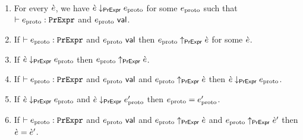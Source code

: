 \begin{condition}\label{condition:proto-expression-isomorphism} ~
\begin{enumerate}
\item For every $\grave{e}$, we have $\grave{e} \downarrow_\mathsf{PrExpr} e_\text{proto}$ for some $e_\text{proto}$ such that $\vdash e_\text{proto} : \mathtt{PrExpr}$ and $e_\text{proto}~\mathsf{val}$.
\item If $\vdash e_\text{proto} : \mathtt{PrExpr}$ and $e_\text{proto}~\mathsf{val}$ then $e_\text{proto} \uparrow_\mathsf{PrExpr} \grave{e}$ for some $\grave{e}$.
\item If $\grave{e} \downarrow_\mathsf{PrExpr} e_\text{proto}$ then $e_\text{proto} \uparrow_\mathsf{PrExpr} \grave{e}$.
\item If $\vdash e_\text{proto} : \mathtt{PrExpr}$ and $e_\text{proto}~\mathsf{val}$ and $e_\text{proto} \uparrow_\mathsf{PrExpr} \grave{e}$ then $\grave{e} \downarrow_\mathsf{PrExpr} e_\text{proto}$.
\item If $\grave{e} \downarrow_\mathsf{PrExpr} e_\text{proto}$ and $\grave{e} \downarrow_\mathsf{PrExpr} e_\text{proto}'$ then $e_\text{proto}=e_\text{proto}'$.
\item If $\vdash e_\text{proto} : \mathtt{PrExpr}$ and $e_\text{proto}~\mathsf{val}$ and $e_\text{proto} \uparrow_\mathsf{PrExpr} \grave{e}$ and $e_\text{proto} \uparrow_\mathsf{PrExpr} \grave{e}'$ then $\grave{e}=\grave{e}'$.
\end{enumerate}
\end{condition}\vspace{10px}


